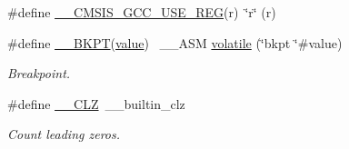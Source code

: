 \begin{DoxyCompactItemize}
\item 
\#define \hyperlink{group___c_m_s_i_s___core___instruction_interface_ga9d94dee7402367961d2cf0accc00fd97}{\+\_\+\+\_\+\+C\+M\+S\+I\+S\+\_\+\+G\+C\+C\+\_\+\+U\+S\+E\+\_\+\+R\+EG}(r)~\char`\"{}r\char`\"{} (r)
\item 
\#define \hyperlink{group___c_m_s_i_s___core___instruction_interface_gaefbccd3648c75a5ce8362e4eae1671b9}{\+\_\+\+\_\+\+B\+K\+PT}(\hyperlink{semihosting_8h_aacce635d68067370c70caa2381ea1040}{value})                                          ~\+\_\+\+\_\+\+A\+SM \hyperlink{semihosting_8h_a3cac76ac70d3a0c44792887ffb7f04ec}{volatile} (\char`\"{}bkpt \char`\"{}\#value)
\begin{DoxyCompactList}\small\item\em Breakpoint. \end{DoxyCompactList}\item 
\#define \hyperlink{group___c_m_s_i_s___core___instruction_interface_ga5d5bb1527e042be4a9fa5a33f65cc248}{\+\_\+\+\_\+\+C\+LZ}~\+\_\+\+\_\+builtin\+\_\+clz
\begin{DoxyCompactList}\small\item\em Count leading zeros. \end{DoxyCompactList}\end{DoxyCompactItemize}
